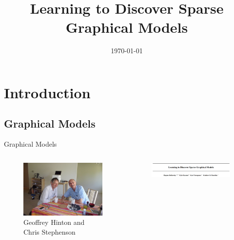 \documentclass{beamer}
\title[Learning Graphical Models]{Learning to Discover Sparse Graphical Models}
\author[Dogan]
{%
  \texorpdfstring{
    \vspace{-0.50cm}
    \begin{columns}
      \column{.55\linewidth}
      \centering
      ICML 2017 \citep{belilovsky2017learning}
    \end{columns}
    \vspace{0.1cm}
    \begin{columns}
      \column{.3\linewidth}
      \centering
      Eugene Belilovsky \\ \tiny{\textit{ESAT-PSI, KU Leuven} \\
        \textit{INRIA} \\ \textit{University of Paris-Saclay}}
      \column{.3\linewidth}
      \centering
      Kyle Kastner \\ \tiny{\textit{University of Montreal}}
    \end{columns}
    \vspace{0.1cm}
    \begin{columns}
      \column{.3\linewidth}
      \centering
      Gael Varoquaux \\ \tiny{\textit{INRIA}}
      \column{.3\linewidth}
      \centering
      Matthew B. Blaschko \\ \tiny{\textit{ESAT-PSI, KU Leuven}}
    \end{columns}
    \vspace{0.1cm}
    \begin{columns}
      \column{.45\linewidth}
      \centering
      Presented by:\\
      Haluk Dogan\\
      \url{https://haluk.github.io/}\\
      \href{mailto:hlk.dogan@gmail.com}{hlk.dogan@gmail.com}
    \end{columns}
}
{Dogan}
}
\institute[UNL] %
{
  Department of Computer Science\\
  University of Nebraska-Lincoln
}
\date[\today] %
{\today}
\begin{document}
\begin{frame}
  \titlepage
\end{frame}

\section{Introduction}
\subsection{Graphical Models}
\begin{frame}{Graphical Models}
  \begin{columns}
    \begin{column}{0.32\textwidth}
      \begin{figure}[ht]
        \centering
        \includegraphics[width=1\textwidth,height=0.5\textheight]{img/hinton_chris}
        \caption*{\tiny{Geoffrey Hinton and Chris Stephenson\label{fig:hinton-chris}}}
      \end{figure}
    \end{column}
    \begin{column}{0.32\textwidth}
      \begin{figure}[ht]
        \centering
        \includegraphics[width=1\textwidth,height=0.2\textheight]{img/learning_graphical_models}
        \caption*{\label{fig:snapshot}}
      \end{figure}
    \end{column}

\end{columns}
\end{frame}
\end{document}
